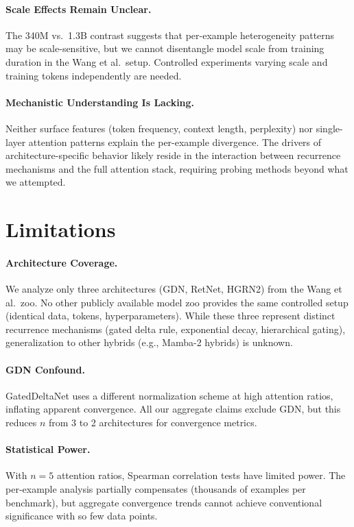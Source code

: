 \documentclass[11pt,a4paper]{article}
\begin{document}
\paragraph{Scale Effects Remain Unclear.}
The 340M vs.\ 1.3B contrast suggests that per-example heterogeneity patterns may be scale-sensitive, but we cannot disentangle model scale from training duration in the Wang et al.\ setup.
Controlled experiments varying scale and training tokens independently are needed.

\paragraph{Mechanistic Understanding Is Lacking.}
Neither surface features (token frequency, context length, perplexity) nor single-layer attention patterns explain the per-example divergence.
The drivers of architecture-specific behavior likely reside in the interaction between recurrence mechanisms and the full attention stack, requiring probing methods beyond what we attempted.

\section{Limitations}
\label{sec:limitations}

\paragraph{Architecture Coverage.}
We analyze only three architectures (GDN, RetNet, HGRN2) from the Wang et al.\ zoo.
No other publicly available model zoo provides the same controlled setup (identical data, tokens, hyperparameters).
While these three represent distinct recurrence mechanisms (gated delta rule, exponential decay, hierarchical gating), generalization to other hybrids (e.g., Mamba-2 hybrids) is unknown.

\paragraph{GDN Confound.}
GatedDeltaNet uses a different normalization scheme at high attention ratios, inflating apparent convergence.
All our aggregate claims exclude GDN, but this reduces $n$ from 3 to 2 architectures for convergence metrics.

\paragraph{Statistical Power.}
With $n = 5$ attention ratios, Spearman correlation tests have limited power.
The per-example analysis partially compensates (thousands of examples per benchmark), but aggregate convergence trends cannot achieve conventional significance with so few data points.
\end{document}
